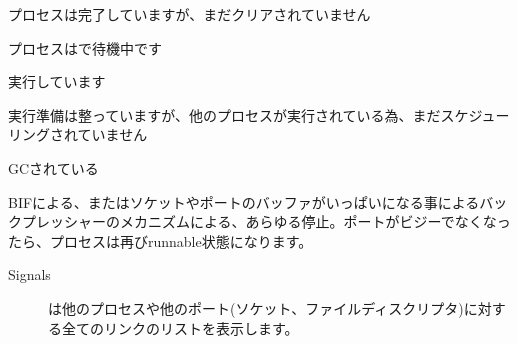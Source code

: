 \begin{description*}
\begin{description}
				\begin{description*}
					\item[\expression{exiting}] プロセスは完了していますが、まだクリアされていません

					\item[\expression{waiting}] プロセスは\expression{receive ... end}で待機中です

					\item[\expression{running}] 実行しています

					\item[\expression{runnable}] 実行準備は整っていますが、他のプロセスが実行されている為、まだスケジューリングされていません

					\item[\expression{garbage\_collecting}] GCされている

					\item[\expression{suspended}] BIFによる、またはソケットやポートのバッファがいっぱいになる事によるバックプレッシャーのメカニズムによる、あらゆる停止。ポートがビジーでなくなったら、プロセスは再びrunnable状態になります。

				\end{description*}
		\end{description}
	\item[Signals] \hfill
		\begin{description}
			\item[] は他のプロセスや他のポート(ソケット、ファイルディスクリプタ)に対する全てのリンクのリストを表示します。


\end{description}
\end{description*}
